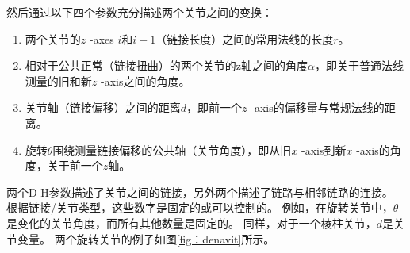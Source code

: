 
然后通过以下四个参数充分描述两个关节之间的变换：


\begin{enumerate}
\item 两个关节的$ z $ -axes $ i $和$ i-1 $（链接长度）之间的常用法线的长度$ r $。
\item 相对于公共正常（链接扭曲）的两个关节的z轴之间的角度$ \alpha $，即关于普通法线测量的旧和新$ z $ -axis之间的角度。
\item 关节轴（链接偏移）之间的距离$ d $，即前一个$ z $ -axis的偏移量与常规法线的距离。
\item 旋转$ \theta $围绕测量链接偏移的公共轴（关节角度），即从旧$ x $ -axis到新$ x $ -axis的角度，关于前一个$ z$轴。
\end{enumerate}


两个D-H参数描述了关节之间的链接，另外两个描述了链路与相邻链路的连接。 根据链接/关节类型，这些数字是固定的或可以控制的。 例如，在旋转关节中，$ \theta$是变化的关节角度，而所有其他数量是固定的。 同样，对于一个棱柱关节，$ d $是关节变量。 两个旋转关节的例子如图\ref {fig：denavit}所示。

